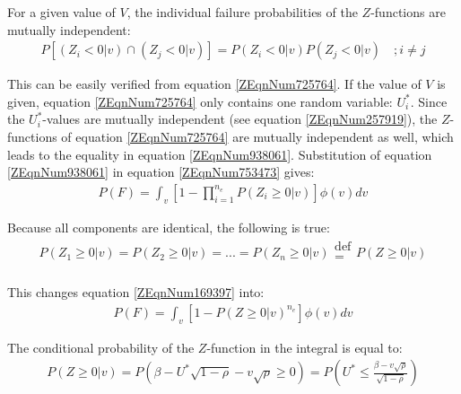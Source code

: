 {For a given value of $V$, the individual failure probabilities of the $Z$-functions are mutually independent:
\begin{align}
P\left[\left(Z_{i} <0|v\right)\cap \left(Z_{j} <0|v\right)\right]=P\left(Z_{i} <0|v\right)P\left(Z_{j} <0|v\right)\quad ;i\ne j\label{ZEqnNum938061} 
\end{align}

This can be easily verified from equation \eqref{ZEqnNum725764}.
If the value of $V$ is given, equation \eqref{ZEqnNum725764} only contains one random variable: $U_i^{*}$.
Since the $U_i^{*}$-values are mutually independent (see equation \eqref{ZEqnNum257919}), the $Z$-functions of equation \eqref{ZEqnNum725764} are mutually independent as well, which leads to the equality in equation \eqref{ZEqnNum938061}.
Substitution of equation \eqref{ZEqnNum938061} in equation \eqref{ZEqnNum753473} gives:
\begin{align}
P\left(F\right)=\int _{v}\left[1-\prod _{i=1}^{n_{e} }P\left(Z_{i} \ge 0  |v\right) \right]  \phi \left(v\right) dv\label{ZEqnNum169397} 
\end{align}

Because all components are identical, the following is true:
\begin{align}
P\left(Z_{1} \ge 0|v\right)=P\left(Z_{2} \ge 0|v\right)=...=P\left(Z_{n} \ge 0|v\right)\begin{array}{c} {\text{def}} \\ {=} \\ {} \end{array}P\left(Z\ge 0|v\right)\label{0.140)} 
\end{align}

This changes equation \eqref{ZEqnNum169397} into:
\begin{align}
P\left(F\right)=\int _{v}\left[1-P\left(Z\ge 0  |v\right)^{n_{e} } \right]  \phi \left(v\right)dv\label{ZEqnNum717936} 
\end{align}

The conditional probability of the $Z$-function in the integral is equal to: 
\begin{align}
P\left(Z\ge 0|v\right)=P\left(\beta -U^{*} \sqrt{1-\rho } -v\sqrt{\rho } \ge 0\right)=P\left(U^{*} \le \frac{\beta -v\sqrt{\rho } }{\sqrt{1-\rho } } \right)\label{ZEqnNum225981} 
\end{align}

}
